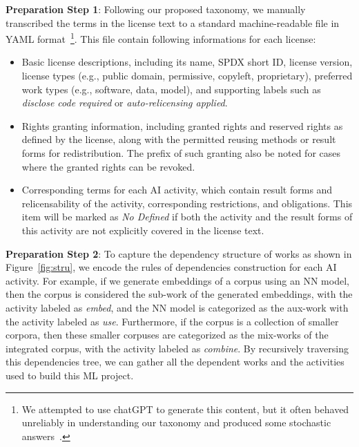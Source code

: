 \textbf{Preparation Step 1}: Following our proposed taxonomy, we manually transcribed the terms in the license text to a standard machine-readable file in YAML format~\footnote{We attempted to use chatGPT to generate this content, but it often behaved unreliably in understanding our taxonomy and produced some stochastic answers~\cite{bender2021dangers}.}.
This file contain following informations for each license:
\begin{itemize}[leftmargin=*]
    \item Basic license descriptions, including its name, SPDX short ID, license version, license types (e.g., public domain, permissive, copyleft, proprietary), preferred work types (e.g., software, data, model), and supporting labels such as \textit{disclose code required} or \textit{auto-relicensing applied}.
    
    \item Rights granting information, including granted rights and reserved rights as defined by the license, along with the permitted reusing methods or result forms for redistribution.
    The prefix of such granting also be noted for cases where the granted rights can be revoked.

    \item Corresponding terms for each AI activity, which contain result forms and relicensability of the activity, corresponding restrictions, and obligations. 
    This item will be marked as \textit{No Defined} if both the activity and the result forms of this activity are not explicitly covered in the license text.
\end{itemize}

\textbf{Preparation Step 2}:
To capture the dependency structure of works as shown in Figure~\ref{fig:stru}, we encode the rules of dependencies construction for each AI activity.
For example, if we generate embeddings of a corpus using an NN model, then the corpus is considered the sub-work of the generated embeddings, with the activity labeled as \textit{embed}, and the NN model is categorized as the aux-work with the activity labeled as \textit{use}.
Furthermore, if the corpus is a collection of smaller corpora, then these smaller corpuses are categorized as the mix-works of the integrated corpus, with the activity labeled as \textit{combine}.
By recursively traversing this dependencies tree, we can gather all the dependent works and the activities used to build this ML project.

